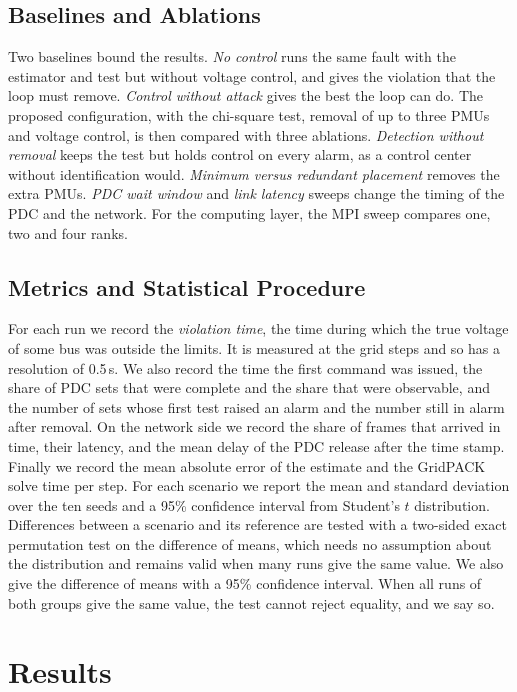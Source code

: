 \documentclass[journal]{IEEEtran}
\begin{document}
\subsection{Baselines and Ablations}

Two baselines bound the results. \emph{No control} runs the same fault with the estimator and test but without voltage control, and gives the violation that the loop must remove. \emph{Control without attack} gives the best the loop can do. The proposed configuration, with the chi-square test, removal of up to three PMUs and voltage control, is then compared with three ablations. \emph{Detection without removal} keeps the test but holds control on every alarm, as a control center without identification would. \emph{Minimum versus redundant placement} removes the extra PMUs. \emph{PDC wait window} and \emph{link latency} sweeps change the timing of the PDC and the network. For the computing layer, the MPI sweep compares one, two and four ranks.

\subsection{Metrics and Statistical Procedure}

For each run we record the \emph{violation time}, the time during which the true voltage of some bus was outside the limits. It is measured at the grid steps and so has a resolution of 0.5\,s. We also record the time the first command was issued, the share of PDC sets that were complete and the share that were observable, and the number of sets whose first test raised an alarm and the number still in alarm after removal. On the network side we record the share of frames that arrived in time, their latency, and the mean delay of the PDC release after the time stamp. Finally we record the mean absolute error of the estimate and the GridPACK solve time per step. For each scenario we report the mean and standard deviation over the ten seeds and a 95\% confidence interval from Student's $t$ distribution. Differences between a scenario and its reference are tested with a two-sided exact permutation test on the difference of means, which needs no assumption about the distribution and remains valid when many runs give the same value. We also give the difference of means with a 95\% confidence interval. When all runs of both groups give the same value, the test cannot reject equality, and we say so.

\section{Results}
\label{sec:results}
\end{document}
